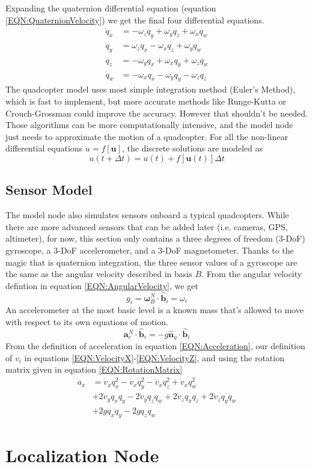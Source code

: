 \documentclass[lettersize,journal]{IEEEtran}
\begin{document}
Expanding the quaternion differential equation (equation  \ref{EQN:QuaternionVelocity}) we get the final four differential equations.
\begin{align}
  \dot{q}_x &= -\omega_z q_y + \omega_y q_z + \omega_x q_w \\
  \dot{q}_y &= \omega_z q_x - \omega_x q_z + \omega_y q_w  \\
  \dot{q}_z &= -\omega_y q_x + \omega_x q_y + \omega_z q_w \\
  \dot{q}_w &=- \omega_x q_x - \omega_y q_y - \omega_z q_z
\end{align}
The quadcopter model uses most simple integration method (Euler's Method), which is fast to implement, but more accurate methods like Runge-Kutta or Crouch-Grossman could improve the accuracy.
However that shouldn't be needed.
Those algorithms can be more computationally intensive, and the model node just needs to approximate the motion of a quadcopter.
For all the non-linear differential equations $\dot{u}=f\left[\mathbf{u}\right]$, the discrete solutions are modeled as
\begin{equation}
  u\left(t+\Delta t\right) = u\left(t\right) + f\left[\mathbf{u}\left(t\right)\right]\Delta t
\end{equation}
\subsection{Sensor Model}
The model node also simulates sensors onboard a typical quadcopters.
While there are more advanced sensors that can be added later (i.e. cameras, GPS, altimeter), for now, this section only contains a three degrees of freedom (3-DoF) gyroscope, a 3-DoF accelerometer, and a 3-DoF magnetometer.
Thanks to the magic that is quaternion integration, the three sensor values of a gyroscope are the same as the angular velocity described in basis $B$.
From the angular velocity defintion in equation \ref{EQN:AngularVelocity}, we get
\begin{equation}
  g_i = \boldsymbol\omega^N_B \cdot \mathbf{\hat{b}}_i = \omega_i
\end{equation}
An accelerometer at the most basic level is a known mass that's allowed to move with respect to its own equations of motion.
\begin{equation}
  \mathbf{a}^N_c\cdot \mathbf{\hat{b}}_i=-g\mathbf{\hat{n}}_y\cdot\mathbf{\hat{b}}_i
\end{equation}
From the definition of acceleration in equation \ref{EQN:Acceleration}, our definition of $v_i$ in equations \ref{EQN:VelocityX}-\ref{EQN:VelocityZ},  and using the rotation matrix given in equation \ref{EQN:RotationMatrix}
\begin{align}
  a_x &= \dot{v}_xq_x^2-\dot{v}_xq_y^2-\ddot{v}_xq_z^2+\dot{v}_xq_w^2\nonumber\\
  &+2\dot{v}_yq_xq_y-2\dot{v}_yq_zq_w+ 2\dot{v}_z q_xq_z+2\dot{v}_zq_yq_w \nonumber\\
  &+2gq_xq_y-2gq_zq_w
\end{align}



\section{Localization Node}
\end{document}
